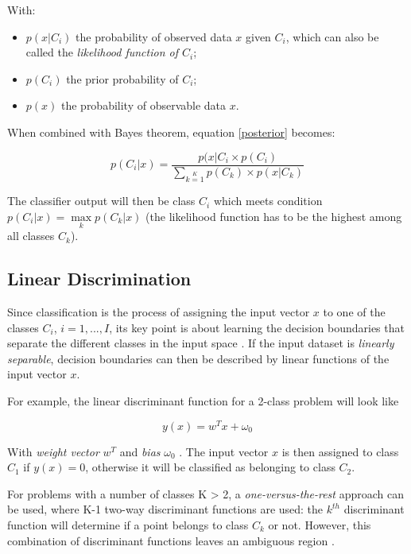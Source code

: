 \noindent With:
\begin{itemize}
\item $p(x|C_i)$ the probability of observed data $x$ given $C_i$, which can also be called the \textit{likelihood function of $C_i$};
\item $p(C_i)$ the prior probability of $C_i$;
\item $p(x)$ the probability of observable data $x$.
\end{itemize} 

\noindent When combined with Bayes theorem, equation \ref{posterior} becomes:

\begin{equation}
	p(C_i|x) = \frac{p(x|C_i \times p(C_i)}{\sum\limits_{k=1}\limits^{K} p(C_k) \times p(x|C_k)}
	\label{posterior_bayes}
\end{equation}

\noindent The classifier output will then be class $C_i$ which meets condition $p(C_i|x) = \max \limits_{k} p(C_k|x)$ (the likelihood function has to be the highest among all classes $C_k$).

\subsection{Linear Discrimination}

\vspace{\baselineskip}
\noindent Since classification is the process of assigning the input vector $x$ to one of the classes $C_i$, $i=1, ..., I$, its key point is about learning the decision boundaries that separate the different classes in the input space \cite{BIS06}. If the input dataset is \textit{linearly separable}, decision boundaries can then be described by linear functions of the input vector $x$.
\newline

\noindent For example, the linear discriminant function for a 2-class problem will look like 

\begin{equation}
y(x) = w^Tx + \omega_0
\end{equation}

\noindent With \textit{weight vector} $w^T$ and \textit{bias} $\omega_0$ \cite{BIS06}. The input vector $x$ is then assigned to class $C_1$ if $y(x) = 0$, otherwise it will be classified as belonging to class $C_2$.
\newline

\noindent For problems with a number of classes K > 2, a \textit{one-versus-the-rest} approach can be used, where K-1 two-way discriminant functions are used: the $k^{th}$ discriminant function will determine if a point belongs to class $C_k$ or not. However, this combination of discriminant functions leaves an ambiguous region \cite{BIS06}. 
\newline


